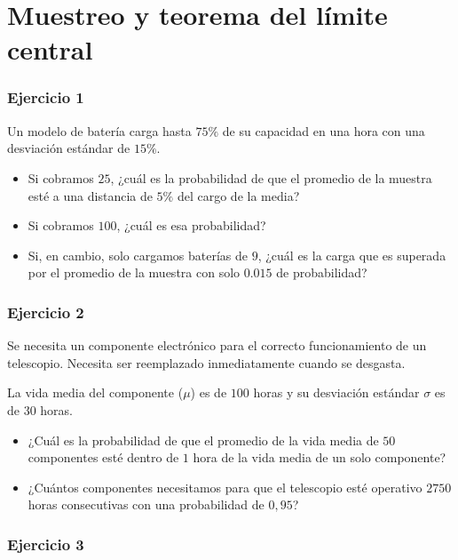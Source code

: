 \documentclass[
]{book}
\begin{document}
\hypertarget{muestreo-y-teorema-del-luxedmite-central}{%
\section{Muestreo y teorema del límite central}\label{muestreo-y-teorema-del-luxedmite-central}}

\hypertarget{ejercicio-1-6}{%
\subsubsection{Ejercicio 1}\label{ejercicio-1-6}}

Un modelo de batería carga hasta \(75\%\) de su capacidad en una hora con una desviación estándar de \(15\%\).

\begin{itemize}
\item
  Si cobramos \(25\), ¿cuál es la probabilidad de que el promedio de la muestra esté a una distancia de \(5\%\) del cargo de la media?
\item
  Si cobramos \(100\), ¿cuál es esa probabilidad?
\item
  Si, en cambio, solo cargamos baterías de \(9\), ¿cuál es la carga que es superada por el promedio de la muestra con solo \(0.015\) de probabilidad?
\end{itemize}

\hypertarget{ejercicio-2-6}{%
\subsubsection{Ejercicio 2}\label{ejercicio-2-6}}

Se necesita un componente electrónico para el correcto funcionamiento de un telescopio. Necesita ser reemplazado inmediatamente cuando se desgasta.

La vida media del componente (\(\mu\)) es de \(100\) horas y su desviación estándar \(\sigma\) es de \(30\) horas.

\begin{itemize}
\item
  ¿Cuál es la probabilidad de que el promedio de la vida media de \(50\) componentes esté dentro de \(1\) hora de la vida media de un solo componente?
\item
  ¿Cuántos componentes necesitamos para que el telescopio esté operativo \(2750\) horas consecutivas con una probabilidad de \(0,95\)?
\end{itemize}

\hypertarget{ejercicio-3-3}{%
\subsubsection{Ejercicio 3}\label{ejercicio-3-3}}
\end{document}
